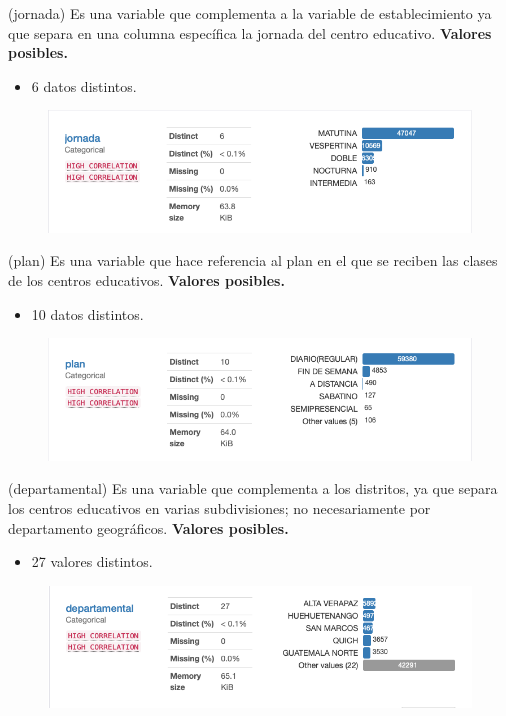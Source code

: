 
\begin{variable}(jornada) 
Es una variable que complementa a la variable de establecimiento ya que separa en una columna específica la jornada del centro educativo.
\bigbreak 
\textbf{Valores posibles.}
\begin{itemize}
	\item 6 datos distintos. 
\end{itemize}
\begin{figure}[H]
	\centering
	\includegraphics[scale=0.5]{Images/13}
\end{figure}
\end{variable}


\begin{variable}(plan) 
Es una variable que hace referencia al plan en el que se reciben las clases de los centros educativos. 
\bigbreak 
\textbf{Valores posibles.}
\begin{itemize}
	\item 10 datos distintos. 
\end{itemize}
\begin{figure}[H]
	\centering
	\includegraphics[scale=0.5]{Images/14}
\end{figure}
\end{variable}


\begin{variable}(departamental) 
Es una variable que complementa a los distritos, ya que separa los centros educativos en varias subdivisiones; no necesariamente por departamento geográficos. 
\bigbreak 
\textbf{Valores posibles.}
\begin{itemize}
	\item 27 valores distintos. 
\end{itemize}
\begin{figure}[H]
	\centering
	\includegraphics[scale=0.5]{Images/15}
\end{figure}
\end{variable}

